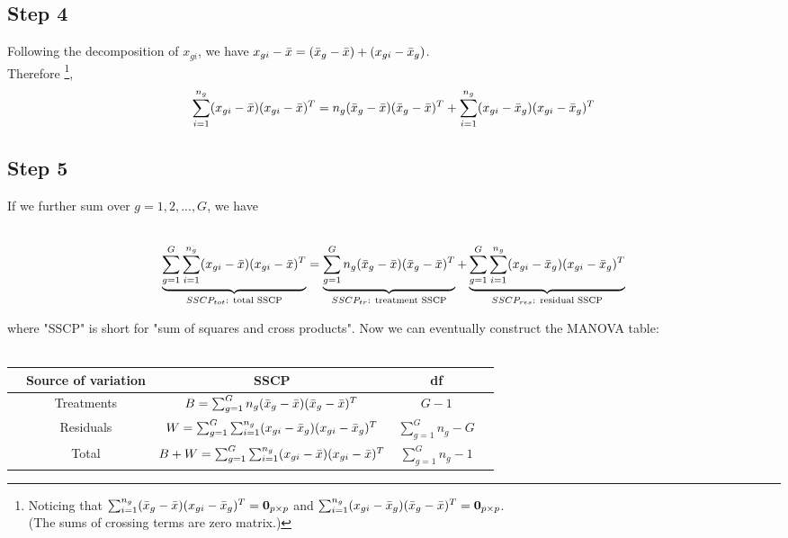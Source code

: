 \documentclass[12pt]{extarticle}
\newcommand{\<}{\langle}
\renewcommand{\>}{\rangle}
\theoremstyle{definition}
\begin{document}
\newpage
\subsection{Step 4}
Following the decomposition of $x_{gi}$, we have $x_{gi} - \Bar{x} = (\Bar{x}_g -\Bar{x}) + (x_{gi} -\Bar{x}_g)$.\\
Therefore \footnote{Noticing that $\sum_{i=1}^{n_g} (\Bar{x}_g -\Bar{x})(x_{gi} -\Bar{x}_g)^T = {\bf 0}_{p \times p}$ and $\sum_{i=1}^{n_g} (x_{gi} -\Bar{x}_g)(\Bar{x}_g -\Bar{x})^T = {\bf 0}_{p \times p}$.\\  (The sums of crossing terms are zero matrix.)},
\begin{eqnarray*}
\sum_{i=1}^{n_g}(x_{gi} - \Bar{x})(x_{gi} - \Bar{x})^T = n_g (\Bar{x}_g -\Bar{x})(\Bar{x}_g -\Bar{x})^T + \sum_{i=1}^{n_g}(x_{gi} -\Bar{x}_g)(x_{gi} -\Bar{x}_g)^T
\end{eqnarray*}

\subsection{Step 5}
If we further sum over $g=1,2,...,G$, we have\\
\ \\
\begin{tcolorbox}[enhanced, drop fuzzy shadow, title=SSCP Decomposition]
\begin{eqnarray*}
\underbrace{\sum_{g=1}^G\sum_{i=1}^{n_g}(x_{gi} - \Bar{x})(x_{gi} - \Bar{x})^T}_\text{$SSCP_{tot}$: total SSCP} = \underbrace{\sum_{g=1}^G n_g (\Bar{x}_g -\Bar{x})(\Bar{x}_g -\Bar{x})^T}_\text{$SSCP_{tr}$: treatment SSCP} + \underbrace{\sum_{g=1}^G \sum_{i=1}^{n_g}(x_{gi} -\Bar{x}_g)(x_{gi} -\Bar{x}_g)^T}_\text{$SSCP_{res}$: residual SSCP}
\end{eqnarray*}
\end{tcolorbox}

where "SSCP" is short for "sum of squares and cross products". Now we can eventually construct the MANOVA table: \\
\ \\ 
\begin{center}
  \begin{tabular*}{\textwidth}{@{\extracolsep{\fill}} ccccc @{}} \hline \hline
    & Source of variation & SSCP & df & \\ \hline 
    & Treatments & $B=\sum_{g=1}^G n_g (\Bar{x}_g -\Bar{x})(\Bar{x}_g -\Bar{x})^T$ & $G-1$  & \\
    & Residuals & $W=\sum_{g=1}^G \sum_{i=1}^{n_g}(x_{gi} -\Bar{x}_g)(x_{gi} -\Bar{x}_g)^T$ & $\sum_{g=1}^G n_g - G$  & \\ \hline
    & Total & $B+W=\sum_{g=1}^G\sum_{i=1}^{n_g}(x_{gi} - \Bar{x})(x_{gi} - \Bar{x})^T$ & $\sum_{g=1}^G n_g - 1$  & \\ \hline \hline
  \end{tabular*}
\end{center}
\end{document}
